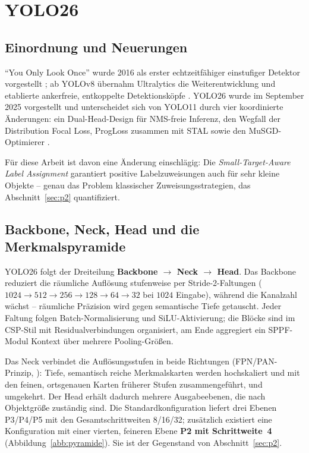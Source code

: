 \section{YOLO26}
\label{sec:yolo26}

\subsection{Einordnung und Neuerungen}

\enquote{You Only Look Once} wurde 2016 als erster echtzeitfähiger einstufiger
Detektor vorgestellt \parencite{redmon2016}; ab YOLOv8 übernahm Ultralytics die
Weiterentwicklung und etablierte ankerfreie, entkoppelte Detektionsköpfe
\parencite{sapkota2025}. YOLO26 wurde im September 2025 vorgestellt und
unterscheidet sich von YOLO11 durch vier koordinierte Änderungen: ein
Dual-Head-Design für NMS-freie Inferenz, den Wegfall der Distribution Focal Loss,
ProgLoss zusammen mit STAL sowie den MuSGD-Optimierer
\parencite{ultralytics2026,sapkota2025}.

Für diese Arbeit ist davon eine Änderung einschlägig: Die
\emph{Small-Target-Aware Label Assignment} garantiert positive Labelzuweisungen
auch für sehr kleine Objekte -- genau das Problem klassischer
Zuweisungsstrategien, das Abschnitt~\ref{sec:p2} quantifiziert.

\subsection{Backbone, Neck, Head und die Merkmalspyramide}
\label{sec:neck}

YOLO26 folgt der Dreiteilung \textbf{Backbone $\to$ Neck $\to$ Head}. Das
Backbone reduziert die räumliche Auflösung stufenweise per Stride-2-Faltungen
($1024 \to 512 \to 256 \to 128 \to 64 \to 32$ bei $1024$\px{} Eingabe), während
die Kanalzahl wächst -- räumliche Präzision wird gegen semantische Tiefe
getauscht. Jeder Faltung folgen Batch-Normalisierung und SiLU-Aktivierung; die
Blöcke sind im CSP-Stil mit Residualverbindungen organisiert, am Ende aggregiert
ein SPPF-Modul Kontext über mehrere Pooling-Größen.

 Das Neck verbindet die Auflösungsstufen in beide Richtungen
(FPN/PAN-Prinzip, \cite{lin2017fpn}): Tiefe, semantisch reiche Merkmalskarten
werden hochskaliert und mit den feinen, ortsgenauen Karten früherer Stufen
zusammengeführt, und umgekehrt. Der Head erhält dadurch mehrere Ausgabeebenen,
die nach Objektgröße zuständig sind. Die Standardkonfiguration liefert drei
Ebenen P3/P4/P5 mit den Gesamtschrittweiten 8/16/32; zusätzlich existiert eine
Konfiguration mit einer vierten, feineren Ebene \textbf{P2 mit Schrittweite~4}
(Abbildung~\ref{abb:pyramide}). Sie ist der Gegenstand von
Abschnitt~\ref{sec:p2}.


